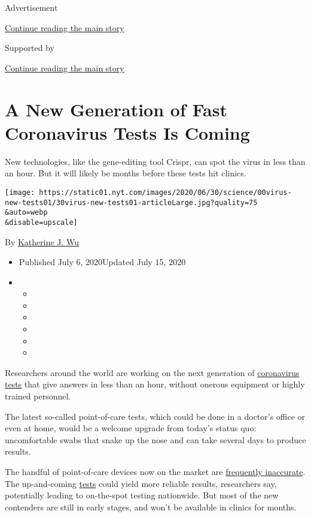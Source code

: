 Advertisement

\protect\hyperlink{after-top}{Continue reading the main story}

Supported by

\protect\hyperlink{after-sponsor}{Continue reading the main story}

\hypertarget{a-new-generation-of-fast-coronavirus-tests-is-coming}{%
\section{A New Generation of Fast Coronavirus Tests Is
Coming}\label{a-new-generation-of-fast-coronavirus-tests-is-coming}}

New technologies, like the gene-editing tool Crispr, can spot the virus
in less than an hour. But it will likely be months before these tests
hit clinics.

\texttt{[image: https://static01.nyt.com/images/2020/06/30/science/00virus-new-tests01/30virus-new-tests01-articleLarge.jpg?quality=75\\\&auto=webp\\\&disable=upscale]}

By \href{https://www.nytimes.com/by/katherine-j--wu}{Katherine J. Wu}

\begin{itemize}
\item
  Published July 6, 2020Updated July 15, 2020
\item
  \begin{itemize}
  \item
  \item
  \item
  \item
  \item
  \item
  \end{itemize}
\end{itemize}

Researchers around the world are working on the next generation of
\href{https://www.nytimes.com/2020/07/15/parenting/kids-covid-19-test.html}{coronavirus
tests} that give answers in less than an hour, without onerous equipment
or highly trained personnel.

The latest so-called point-of-care tests, which could be done in a
doctor's office or even at home, would be a welcome upgrade from today's
status quo: uncomfortable swabs that snake up the nose and can take
several days to produce results.

The handful of point-of-care devices now on the market are
\href{https://www.nytimes.com/2020/05/13/health/coronavirus-testing-white-house.html}{frequently
inaccurate}. The up-and-coming
\href{https://www.nytimes.com/2020/07/15/parenting/kids-covid-19-test.html}{tests}
could yield more reliable results, researchers say, potentially leading
to on-the-spot testing nationwide. But most of the new contenders are
still in early stages, and won't be available in clinics for months.

